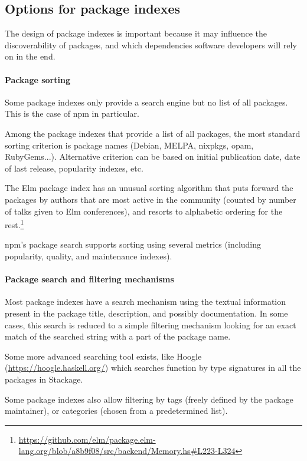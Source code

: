 \subsection{Options for package indexes}

The design of package indexes is important because it may influence the discoverability of packages, and which dependencies software developers will rely on in the end.

\paragraph{Package sorting}

Some package indexes only provide a search engine but no list of all packages.
This is the case of npm in particular.

Among the package indexes that provide a list of all packages, the most standard sorting criterion is package names (Debian, MELPA, nixpkgs, opam, RubyGems...).
Alternative criterion can be based on initial publication date, date of last release, popularity indexes, etc.

The Elm package index has an unusual sorting algorithm that puts forward the packages by authors that are most active in the community (counted by number of talks given to Elm conferences), and resorts to alphabetic ordering for the rest.\footnote{
	\url{https://github.com/elm/package.elm-lang.org/blob/a8b9f08/src/backend/Memory.hs\#L223-L324}
}

npm's package search supports sorting using several metrics (including popularity, quality, and maintenance indexes).

\paragraph{Package search and filtering mechanisms}

Most package indexes have a search mechanism using the textual information present in the package title, description, and possibly documentation.
In some cases, this search is reduced to a simple filtering mechanism looking for an exact match of the searched string with a part of the package name.

Some more advanced searching tool exists, like Hoogle (\url{https://hoogle.haskell.org/}) which searches function by type signatures in all the packages in Stackage.

Some package indexes also allow filtering by tags (freely defined by the package maintainer), or categories (chosen from a predetermined list).

